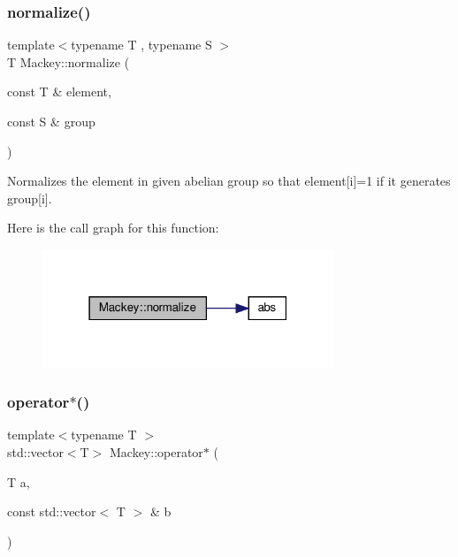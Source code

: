 \mbox{\label{namespaceMackey_a6aa639a1f656fdcccbcfa6bc719bb817}} 
\subsubsection{\texorpdfstring{normalize()}{normalize()}}
{\footnotesize\ttfamily template$<$typename T , typename S $>$ \\
T Mackey\+::normalize (\begin{DoxyParamCaption}\item[{const T \&}]{element,  }\item[{const S \&}]{group }\end{DoxyParamCaption})}



Normalizes the element in given abelian group so that element\mbox{[}i\mbox{]}=1 if it generates group\mbox{[}i\mbox{]}. 

Here is the call graph for this function\+:\nopagebreak
\begin{figure}[H]
\begin{center}
\leavevmode
\includegraphics[width=247pt]{namespaceMackey_a6aa639a1f656fdcccbcfa6bc719bb817_cgraph}
\end{center}
\end{figure}
\mbox{\label{namespaceMackey_ae235ee5dd92dc1ca64388b8fbb1b4d75}} 
\subsubsection{\texorpdfstring{operator$\ast$()}{operator*()}}
{\footnotesize\ttfamily template$<$typename T $>$ \\
std\+::vector$<$T$>$ Mackey\+::operator$\ast$ (\begin{DoxyParamCaption}\item[{T}]{a,  }\item[{const std\+::vector$<$ T $>$ \&}]{b }\end{DoxyParamCaption})}



